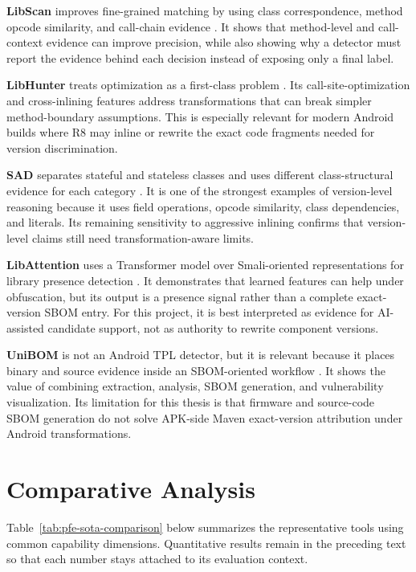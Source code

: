 \textbf{LibScan} improves fine-grained matching by using class
correspondence, method opcode similarity, and call-chain evidence
\cite{wu2023libscan}. It shows that method-level and call-context evidence
can improve precision, while also showing why a detector must report the
evidence behind each decision instead of exposing only a final label.

\textbf{LibHunter} treats optimization as a first-class problem
\cite{xie2024libhunter}. Its call-site-optimization and cross-inlining
features address transformations that can break simpler method-boundary
assumptions. This is especially relevant for modern Android builds where R8
may inline or rewrite the exact code fragments needed for version
discrimination.

\textbf{SAD} separates stateful and stateless classes and uses different
class-structural evidence for each category \cite{zhou2025sad}. It is one of
the strongest examples of version-level reasoning because it uses field
operations, opcode similarity, class dependencies, and literals. Its
remaining sensitivity to aggressive inlining confirms that version-level
claims still need transformation-aware limits.

\textbf{LibAttention} uses a Transformer model over Smali-oriented
representations for library presence detection \cite{pan2025libattention}.
It demonstrates that learned features can help under obfuscation, but its
output is a presence signal rather than a complete exact-version SBOM entry.
For this project, it is best interpreted as evidence for AI-assisted
candidate support, not as authority to rewrite component versions.

\textbf{UniBOM} is not an Android TPL detector, but it is relevant because it
places binary and source evidence inside an SBOM-oriented workflow
\cite{safronov2025unibom}. It shows the value of combining extraction,
analysis, SBOM generation, and vulnerability visualization. Its limitation
for this thesis is that firmware and source-code SBOM generation do not solve
APK-side Maven exact-version attribution under Android transformations.

\section{Comparative Analysis}

Table~\ref{tab:pfe-sota-comparison} below summarizes the representative tools
using common capability dimensions. Quantitative results remain in the
preceding text so that each number stays attached to its evaluation context.

